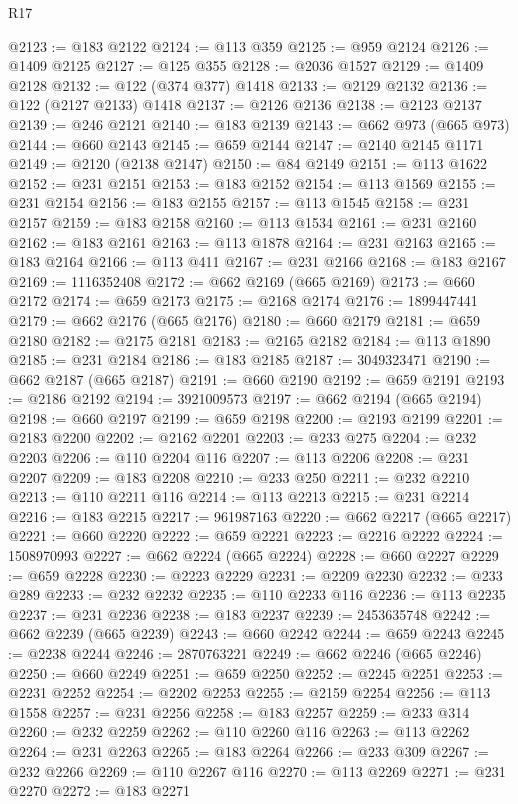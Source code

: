 \begin{lexlean}{R17}
\begin{coremodule}
{{{{{{{{{{{{{{{{{{{{{{{{{{{{{{{{{{{{{{{{{{{{{{{{{{{{{{{{{{{{{{{{{{{{{{{{{{{{{{{{{{{{{@2123 := @183 @2122
@2124 := @113 @359
@2125 := @959 @2124
@2126 := @1409 @2125
@2127 := @125 @355
@2128 := @2036 @1527
@2129 := @1409 @2128
@2132 := @122 (@374 @377) @1418
@2133 := @2129 @2132
@2136 := @122 (@2127 @2133) @1418
@2137 := @2126 @2136
@2138 := @2123 @2137
@2139 := @246 @2121
@2140 := @183 @2139
@2143 := @662 @973 (@665 @973)
@2144 := @660 @2143
@2145 := @659 @2144
@2147 := @2140 @2145 @1171
@2149 := @2120 (@2138 @2147)
@2150 := @84 @2149
@2151 := @113 @1622
@2152 := @231 @2151
@2153 := @183 @2152
@2154 := @113 @1569
@2155 := @231 @2154
@2156 := @183 @2155
@2157 := @113 @1545
@2158 := @231 @2157
@2159 := @183 @2158
@2160 := @113 @1534
@2161 := @231 @2160
@2162 := @183 @2161
@2163 := @113 @1878
@2164 := @231 @2163
@2165 := @183 @2164
@2166 := @113 @411
@2167 := @231 @2166
@2168 := @183 @2167
@2169 := 1116352408
@2172 := @662 @2169 (@665 @2169)
@2173 := @660 @2172
@2174 := @659 @2173
@2175 := @2168 @2174
@2176 := 1899447441
@2179 := @662 @2176 (@665 @2176)
@2180 := @660 @2179
@2181 := @659 @2180
@2182 := @2175 @2181
@2183 := @2165 @2182
@2184 := @113 @1890
@2185 := @231 @2184
@2186 := @183 @2185
@2187 := 3049323471
@2190 := @662 @2187 (@665 @2187)
@2191 := @660 @2190
@2192 := @659 @2191
@2193 := @2186 @2192
@2194 := 3921009573
@2197 := @662 @2194 (@665 @2194)
@2198 := @660 @2197
@2199 := @659 @2198
@2200 := @2193 @2199
@2201 := @2183 @2200
@2202 := @2162 @2201
@2203 := @233 @275
@2204 := @232 @2203
@2206 := @110 @2204 @116
@2207 := @113 @2206
@2208 := @231 @2207
@2209 := @183 @2208
@2210 := @233 @250
@2211 := @232 @2210
@2213 := @110 @2211 @116
@2214 := @113 @2213
@2215 := @231 @2214
@2216 := @183 @2215
@2217 := 961987163
@2220 := @662 @2217 (@665 @2217)
@2221 := @660 @2220
@2222 := @659 @2221
@2223 := @2216 @2222
@2224 := 1508970993
@2227 := @662 @2224 (@665 @2224)
@2228 := @660 @2227
@2229 := @659 @2228
@2230 := @2223 @2229
@2231 := @2209 @2230
@2232 := @233 @289
@2233 := @232 @2232
@2235 := @110 @2233 @116
@2236 := @113 @2235
@2237 := @231 @2236
@2238 := @183 @2237
@2239 := 2453635748
@2242 := @662 @2239 (@665 @2239)
@2243 := @660 @2242
@2244 := @659 @2243
@2245 := @2238 @2244
@2246 := 2870763221
@2249 := @662 @2246 (@665 @2246)
@2250 := @660 @2249
@2251 := @659 @2250
@2252 := @2245 @2251
@2253 := @2231 @2252
@2254 := @2202 @2253
@2255 := @2159 @2254
@2256 := @113 @1558
@2257 := @231 @2256
@2258 := @183 @2257
@2259 := @233 @314
@2260 := @232 @2259
@2262 := @110 @2260 @116
@2263 := @113 @2262
@2264 := @231 @2263
@2265 := @183 @2264
@2266 := @233 @309
@2267 := @232 @2266
@2269 := @110 @2267 @116
@2270 := @113 @2269
@2271 := @231 @2270
@2272 := @183 @2271
}}}}}}}}}}}}}}}}}}}}}}}}}}}}}}}}}}}}}}}}}}}}}}}}}}}}}}}}}}}}}}}}}}}}}}}}}}}}}}}}}}}}}
\end{coremodule}
\end{lexlean}
